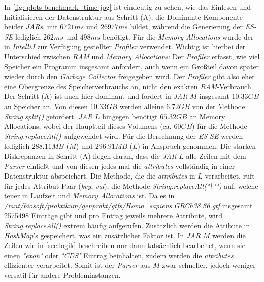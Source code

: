 \documentclass[12pt]{article}
\begin{document}
In \ref{fig:-plots-benchmark_time-jpg} ist eindeutig zu sehen, wie das Einlesen und Initialisieren
der Datenstruktur aus Schritt (A), die Dominante Komponente beider \textit{JARs}, mit $6721ms$ und $26977ms$ bildet, während die Generierung der
\textit{ES-SE} lediglich $262ms$ und $498ms$ benötigt.
Für die \textit{Memory Allocations} wurde der in \textit{IntelliJ} zur Verfügung gestellter \textit{Profiler} verwendet.
Wichtig ist hierbei der Unterschied zwischen \textit{RAM} und \textit{Memory Allocations}:
Der \textit{Profiler} erfasst, wie viel Speicher ein Programm insgesamt anfordert, 
auch wenn ein Großteil davon später wieder durch den \textit{Garbage Collector} freigegeben wird.
Der \textit{Profiler} gibt also eher eine Obergrenze des Speicherverbrauchs an, nicht den exakten \textit{RAM}-Verbrauch.
Der Schritt (A) ist auch hier dominant und fordert in \textit{JAR} $M$ insgesamt $10.33GB$ an Speicher an.
Von diesen $10.33GB$ werden alleine $6.72GB$ von der Methode \textit{String.split()} gefordert.
\textit{JAR} $L$ hingegen benötigt $65.32GB$ an Memory Allocations, wobei der Hauptteil 
dieses Volumens (ca. $60GB$) für die Methode \textit{String.replaceAll()} aufgewendet wird.
Für die Berechnung der \textit{ES-SE} werden lediglich $288.11MB$ ($M$) und $296.91MB$ ($L$) in Anspruch genommen.
Die starken Diskrepanzen in Schritt (A) liegen daran, dass die \textit{JAR} $L$ alle Zeilen mit dem 
\textit{Parser} einlie\ss t und von diesen jedes mal die \textit{attributes} vollständig in einer
Datenstruktur abspeichert. Die Methode, die die \textit{attributes} in $L$ verarbeitet, ruft für jedes Attribut-Paar
(\textit{key}, \textit{val}), die Methode \textit{String.replaceAll("\textbackslash "")} auf, welche teuer 
in Laufzeit und \textit{Memory Allocations} ist.
Da es in \textit{/mnt/biosoft/praktikum/genprakt/gtfs/Homo\_sapiens.GRCh38.86.gtf} insgesamt 2575498 Einträge gibt
und pro Entrag jeweils mehrere Attribute, wird \textit{String.replaceAll()} extrem häufig aufgerufen.
Zusätzlich werden die Attibute in \textit{HashMap}'s gespeichert, was ein zusätzlicher Faktor ist.
In \textit{JAR} $M$ werden die Zeilen wie in \ref{sec:logik} beschreiben nur dann tatsächlich bearbeitet,
wenn sie einen \textit{"exon"} oder \textit{"CDS"} Eintrag beinhalten, zudem werden die \textit{attributes} effizienter 
verarbeitet. Somit ist der \textit{Parser} aus $M$ zwar schneller, jedoch weniger versatil für andere Probleminstanzen.
\end{document}
